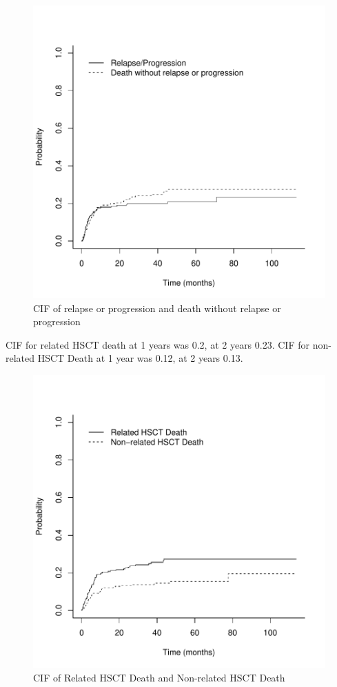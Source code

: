 \documentclass[a4paper,11pt] {article}
\begin{document}
\begin{figure}[h]
\begin{center}
\includegraphics{Rapport-fig6}
\end{center}
\caption{CIF of relapse or progression and death without relapse or progression}
\label{fig6}
\end{figure}

\pagebreak
CIF for related HSCT death at 1 years was 0.2, at 2 years  0.23.
CIF for non-related HSCT Death at 1 year was 0.12, at 2 years  0.13.
\begin{figure}[h]
\begin{center}
\includegraphics{Rapport-fig5}
\end{center}
\caption{CIF of Related HSCT Death and Non-related HSCT Death}
\label{fig5}
\end{figure}
\end{document}

